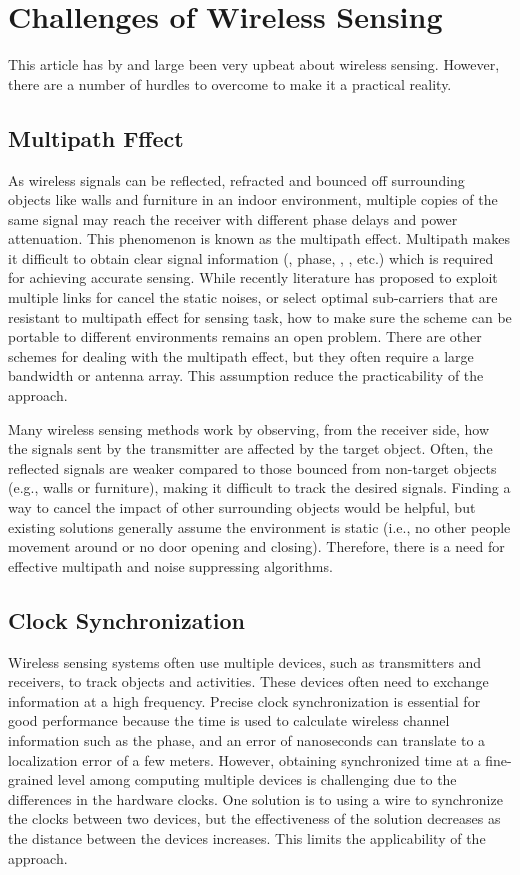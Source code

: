 \section{Challenges of Wireless Sensing}
This article has by and large been very upbeat about wireless sensing. However, there are a number of hurdles to overcome to make it a
practical reality.

\subsection{Multipath Fffect}

As wireless signals can be reflected, refracted and bounced off surrounding objects like walls and furniture in an indoor environment,
multiple copies of the same signal may reach the receiver with different phase delays and power attenuation. This phenomenon is known as
the multipath effect. Multipath makes it difficult to obtain clear signal information (\RSSI, phase, \AoA, \TOF, etc.) which is required
for achieving accurate sensing. While recently literature has proposed to exploit multiple links for cancel the static noises, or select
optimal sub-carriers that are resistant to multipath effect for sensing task, how to make sure the scheme can be portable to different
environments remains an open problem. There are other schemes for dealing with the multipath effect, but they often require a large
bandwidth or antenna array. This assumption reduce the practicability of the approach.


Many wireless sensing methods work by observing, from the receiver side, how the signals sent by the transmitter are affected by the target
object. Often, the reflected signals are weaker compared to those bounced from non-target objects (e.g., walls or furniture), making it
difficult to track the desired signals. Finding a way to cancel the impact of other surrounding objects would be helpful, but existing
solutions generally assume the environment is static (i.e., no other people movement around or no door opening and closing). Therefore,
there is a need for effective multipath and noise suppressing algorithms.


\subsection{Clock Synchronization} Wireless sensing systems often use multiple devices, such as transmitters and receivers, to track
objects and activities. These devices often need to exchange information at a high frequency. Precise clock synchronization is essential
for good performance because the time is used to calculate wireless channel information such as the phase, and an error of nanoseconds can
translate to a localization error of a few meters. However, obtaining synchronized time at a fine-grained level among computing multiple
devices is challenging due to the differences in the hardware clocks. One solution is to using a wire to synchronize the clocks between two
devices, but the effectiveness of the solution decreases as the distance between the devices increases. This limits the applicability of
the approach.

